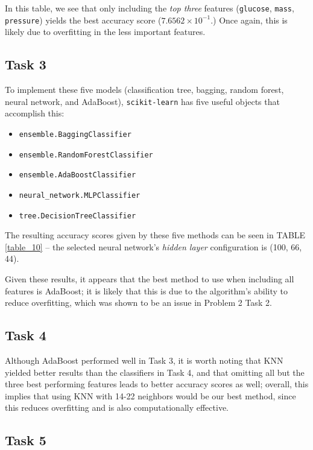 \documentclass[twoside,twocolumn,10pt]{revtex4-1}
\begin{document}
	In this table, we see that only including the \textit{top three} features (\texttt{glucose}, \texttt{mass}, \texttt{pressure}) yields the best accuracy score ($7.6562 \times 10^{-1}$.) Once again, this is likely due to overfitting in the less important features.
	
	\subsection*{Task 3}
	
	To implement these five models (classification tree, bagging, random forest, neural network, and AdaBoost), \texttt{scikit-learn} has five useful objects that accomplish this:
	
	\begin{itemize}
	\item \texttt{ensemble.BaggingClassifier}
	\item \texttt{ensemble.RandomForestClassifier}
	\item \texttt{ensemble.AdaBoostClassifier}
	\item \texttt{neural\_network.MLPClassifier}
	\item \texttt{tree.DecisionTreeClassifier}
	\end{itemize}
	
	The resulting accuracy scores given by these five methods can be seen in TABLE \ref{table_10} – the selected neural network's \textit{hidden layer} configuration is (100, 66, 44). 
	
	Given these results, it appears that the best method to use when including all features is AdaBoost; it is likely that this is due to the algorithm's ability to reduce overfitting, which was shown to be an issue in Problem 2 Task 2.
	
	\subsection*{Task 4}
	
	Although AdaBoost performed well in Task 3, it is worth noting that KNN yielded better results than the classifiers in Task 4, and that omitting all but the three best performing features leads to better accuracy scores as well; overall, this implies that using KNN with 14-22 neighbors would be our best method, since this reduces overfitting and is also computationally effective.
	
	\subsection*{Task 5}
	
\end{document}
